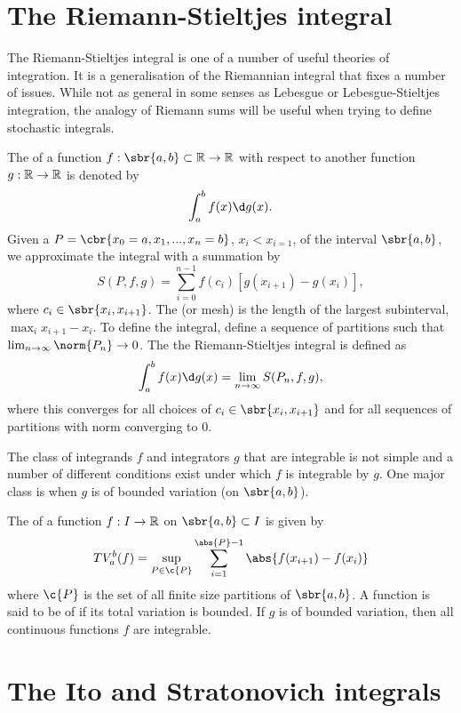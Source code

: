 \section{The Riemann-Stieltjes integral}

The Riemann-Stieltjes integral is one of a number of useful theories of integration.
It is a generalisation of the Riemannian integral that fixes a number of issues.
While not as general in some senses as Lebesgue or Lebesgue-Stieltjes integration, the analogy of Riemann sums will be useful when trying to define stochastic integrals.

The  of a function \(f: \sbr{a, b}\subset \R \to \R\) with respect to another function \(g: \mathbb{R} \to \mathbb{R}\) is denoted by \[\int_a^b f(x)\d g(x).\]
Given a  \(P = \cbr{x_0=a, x_1, ..., x_n=b}\), \(x_i < x_{i=1}\), of the interval \(\sbr{a, b}\), we approximate the integral with a summation by \[S(P, f, g) = \sum_{i=0}^{n-1} f(c_i)[g(x_{i+1}) - g(x_i)],\] where \(c_i \in \sbr{x_i, x_{i+1}}\).
The  (or mesh) is the length of the largest subinterval, \(\max_i x_{i+1} - x_i\).
To define the integral, define a sequence of partitions such that \(\lim_{n\to \infty} \norm{P_n} \to 0\).
The the Riemann-Stieltjes integral is defined as \[\int_a^b f(x)\d g(x) = \lim_{n\to\infty} S(P_n, f, g),\] where this converges for all choices of \(c_i \in \sbr{x_i, x_{i+1}}\) and for all sequences of partitions with norm converging to \(0\).

The class of integrands \(f\) and integrators \(g\) that are integrable is not simple and a number of different conditions exist under which \(f\) is integrable by \(g\).
One major class is when \(g\) is of bounded variation (on \(\sbr{a, b}\)).

The  of a function \(f:I \to \mathbb{R}\) on \(\sbr{a, b} \subset I\) is given by 
\[
	TV_a^b(f) = \sup_{P\in \c{P}} \sum_{i=1}^{\abs{P}-1} \abs{f(x_{i+1}) - f(x_i)}
\]
where \(\c{P}\) is the set of all finite size partitions of \(\sbr{a, b}\).
A function is said to be of  if its total variation is bounded.
If \(g\) is of bounded variation, then all continuous functions \(f\) are integrable.

\section{The Ito and Stratonovich integrals}
\label{sec:ito_strat_integrals}

